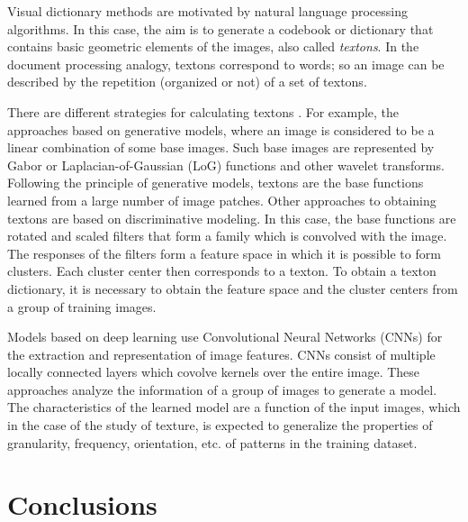 Visual dictionary methods are motivated by natural language processing algorithms. In this case, the aim is to generate a codebook or dictionary that contains basic geometric elements of the images, also called \textit{textons}. In the document processing analogy, textons correspond to words; so an image can be described by the repetition (organized or not) of a set of textons.

There are different strategies for calculating textons \citep{Zhu.Guo.ea:IJCV:2005}. For example, the approaches based on generative models, where an image is considered to be a linear combination of some base images. Such base images are represented by Gabor or Laplacian-of-Gaussian (LoG) functions and other wavelet transforms. Following the principle of generative models, textons are the base functions learned from a large number of image patches.
Other approaches to obtaining textons are based on discriminative modeling. In this case, the base functions are rotated and scaled filters that form a family which is convolved with the image. The responses of the filters form a feature space  in which it is possible to form clusters. Each cluster center then corresponds to a texton. To obtain a texton dictionary, it is necessary to obtain the feature space and the cluster centers from a group of training images.

Models based on deep learning use Convolutional Neural Networks (CNNs) for the extraction and representation of image features. CNNs consist of multiple locally connected layers which covolve kernels over the entire image. These approaches analyze the information of a group of images to generate a model. The characteristics of the learned model are a function of the input images, which in the case of the study of texture, is expected to generalize the properties of granularity, frequency, orientation, etc. of patterns in the training dataset.


\section{Conclusions}

